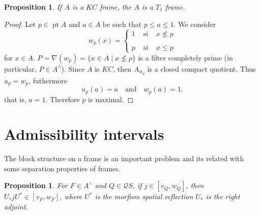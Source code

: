 \documentclass[11pt]{amsart}
\DeclareMathOperator{\pt}{pt}
\theoremstyle{plain}
\newtheorem{prop}[thm]{Proposition}
\theoremstyle{definition}
\begin{document}
\begin{prop}\label{KCT1}
If $A$ is a $KC$ frame, the $A$ is a $T_1$ frame.
\end{prop}

\begin{proof}
Let $p\in \pt A$ and $a\in A$ be such that $p\leq a\leq 1$. We consider 
\[
w_p(x)=\left\{\begin{array}{lcc}
1 & \mbox{ si } & x\nleq p\\
\\
p & \mbox{ si } & x\leq p
\end{array}\right.
\]
for $x\in A$. $P=\nabla(w_p)=\{x\in A\mid x\nleq p\}$ is a filter completely prime (in particular, $P\in A^\wedge$). Since $A$ is $KC$, then $A_{w_p}$ is a closed compact quotient. Thus $u_p=w_p$, futhermore
\[
u_p(a)=a\quad \mbox{and}\quad w_p(a)=1.
\]
that is, $a=1$. Therefore $p$ is maximal. 
\end{proof}

\section{Admissibility intervals}

The block structure on a frame is an important problem and its related with some separation properties of frames.
\begin{prop}\label{morfismo}
For $F\in A^\wedge$ and $Q\in\mathcal{Q}S$, if $j\in [v_Q, w_Q]$, then $U_*jU^*\in [v_F, w_F]$, where $U^*$ is the morfism spatial reflection $U_*$ is the right adjoint.
\end{prop}
\end{document}

